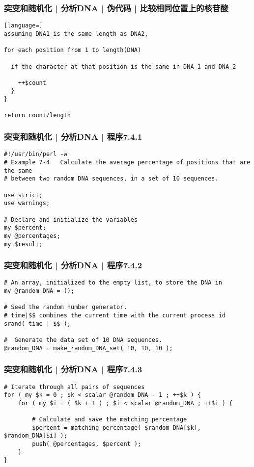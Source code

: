 \begin{frame}[fragile]
  \frametitle{突变和随机化 | 分析DNA | 伪代码 | 比较相同位置上的核苷酸}
  \vspace{-1.5em}
\begin{lstlisting}[language=]
assuming DNA1 is the same length as DNA2,

for each position from 1 to length(DNA)

  if the character at that position is the same in DNA_1 and DNA_2

    ++$count
  }
}

return count/length
\end{lstlisting}
\end{frame}

\begin{frame}[fragile]
  \frametitle{突变和随机化 | 分析DNA | 程序7.4.1}
  \vspace{-1.5em}
\begin{lstlisting}[firstnumber=1]
#!/usr/bin/perl -w
# Example 7-4   Calculate the average percentage of positions that are the same
# between two random DNA sequences, in a set of 10 sequences.

use strict;
use warnings;

# Declare and initialize the variables
my $percent;
my @percentages;
my $result;
\end{lstlisting}
\end{frame}

\begin{frame}[fragile]
  \frametitle{突变和随机化 | 分析DNA | 程序7.4.2}
  \vspace{-1.5em}
\begin{lstlisting}[firstnumber=13]
# An array, initialized to the empty list, to store the DNA in
my @random_DNA = ();

# Seed the random number generator.
# time|$$ combines the current time with the current process id
srand( time | $$ );

#  Generate the data set of 10 DNA sequences.
@random_DNA = make_random_DNA_set( 10, 10, 10 );
\end{lstlisting}
\end{frame}

\begin{frame}[fragile]
  \frametitle{突变和随机化 | 分析DNA | 程序7.4.3}
  \vspace{-1.5em}
\begin{lstlisting}[firstnumber=23]
# Iterate through all pairs of sequences
for ( my $k = 0 ; $k < scalar @random_DNA - 1 ; ++$k ) {
    for ( my $i = ( $k + 1 ) ; $i < scalar @random_DNA ; ++$i ) {

        # Calculate and save the matching percentage
        $percent = matching_percentage( $random_DNA[$k], $random_DNA[$i] );
        push( @percentages, $percent );
    }
}
\end{lstlisting}
\end{frame}

